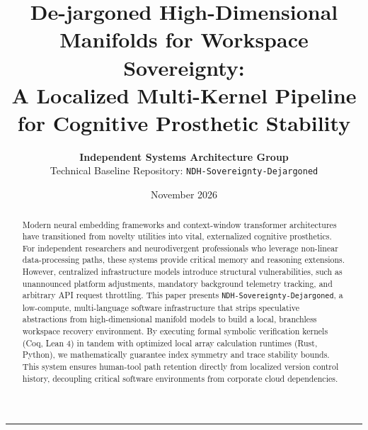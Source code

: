 \documentclass[11pt,fleqn]{article}
\title{\textbf{De-jargoned High-Dimensional Manifolds for Workspace Sovereignty:\\A Localized Multi-Kernel Pipeline for Cognitive Prosthetic Stability}}
\author{
    \textbf{Independent Systems Architecture Group} \\
    \small Technical Baseline Repository: \texttt{NDH-Sovereignty-Dejargoned}
}
\date{\small November 2026}
\begin{document}
\maketitle

\begin{abstract}
Modern neural embedding frameworks and context-window transformer architectures have transitioned from novelty utilities into vital, externalized cognitive prosthetics. For independent researchers and neurodivergent professionals who leverage non-linear data-processing paths, these systems provide critical memory and reasoning extensions. However, centralized infrastructure models introduce structural vulnerabilities, such as unannounced platform adjustments, mandatory background telemetry tracking, and arbitrary API request throttling. This paper presents \texttt{NDH-Sovereignty-Dejargoned}, a low-compute, multi-language software infrastructure that strips speculative abstractions from high-dimensional manifold models to build a local, branchless workspace recovery environment. By executing formal symbolic verification kernels (Coq, Lean 4) in tandem with optimized local array calculation runtimes (Rust, Python), we mathematically guarantee index symmetry and trace stability bounds. This system ensures human-tool path retention directly from localized version control history, decoupling critical software environments from corporate cloud dependencies.
\end{abstract}

\vspace{1em}
\hrule
\vspace{1em}










\end{document}

